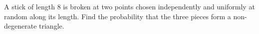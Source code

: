 A stick of length $8$ is broken at two points chosen independently and uniformly at random along its length. Find the probability that the three pieces form a non-degenerate triangle.
